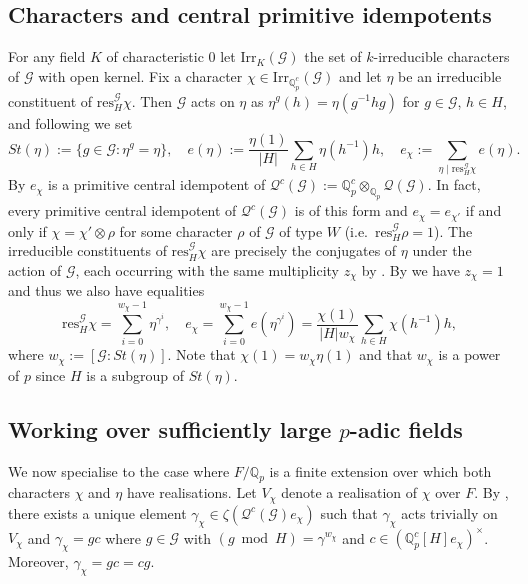 \documentclass[12pt]{amsart}
\theoremstyle{plain}
\theoremstyle{remark}
\theoremstyle{definition}
\numberwithin{equation}{section}
\begin{document}
\subsection{Characters and central primitive idempotents} \label{subsec:idempotents}
For any field $K$ of characteristic $0$ let ${\mathrm{Irr}}_{K}(\mathcal{G})$ the set of $k$-irreducible characters of $\mathcal{G}$ with open kernel.
Fix a character $\chi \in {\mathrm{Irr}}_{{\mathbb{Q}}_{p}^{c}}(\mathcal{G})$ and let $\eta$ be an irreducible constituent of
${\mathrm{res}}^{\mathcal{G}}_{H} \chi$.
Then $\mathcal{G}$ acts on $\eta$ as $\eta^{g}(h) = \eta(g^{-1}hg)$
for $g \in \mathcal{G}$, $h \in H$, and following \cite[\S 2]{MR2114937} we set
\[
St(\eta) := \{g \in \mathcal{G}: \eta^g = \eta \}, \quad e(\eta) := \frac{\eta(1)}{|H|} \sum_{h \in H} \eta(h^{-1}) h,
\quad e_{\chi} := \sum_{\eta \mid {\mathrm{res}}^{\mathcal{G}}_{H} \chi} e(\eta).
\]
By \cite[Corollary to Proposition 6]{MR2114937} $e_{\chi}$ is a primitive central idempotent of
$\mathcal{Q}^{c}(\mathcal{G}) := {\mathbb{Q}}_{p}^{c} \otimes_{{\mathbb{Q}}_{p}} \mathcal{Q}(\mathcal{G})$.
In fact, every primitive central idempotent of $\mathcal{Q}^{c}(\mathcal{G})$ is of this form
and $e_{\chi} = e_{\chi'}$ if and only if $\chi = \chi' \otimes \rho$ for some character $\rho$ of $\mathcal{G}$ of type $W$
(i.e.~${\mathrm{res}}^{\mathcal{G}}_{H} \rho = 1$).
The irreducible constituents of ${\mathrm{res}}^{\mathcal{G}}_{H} \chi$ are precisely the conjugates of $\eta$
under the action of $\mathcal{G}$, each occurring with the same multiplicity $z_{\chi}$ by \cite[Proposition 11.4]{MR632548}. By \cite[Lemma 4]{MR2114937} we have $z_{\chi}=1$ and thus we also have equalities
\begin{equation}\label{eq:idem-sum}
{\mathrm{res}}^{\mathcal{G}}_{H} \chi = \sum_{i=0}^{w_{\chi}-1} \eta^{\gamma^{i}},
\quad
e_{\chi} = \sum_{i=0}^{w_{\chi}-1} e(\eta^{\gamma^{i}}) = \frac{\chi(1)}{|H|w_{\chi}}\sum_{h \in H} \chi(h^{-1})h,
\end{equation}
where $w_{\chi} := [\mathcal{G} : St(\eta)]$.
Note that  $\chi(1) = w_{\chi} \eta(1)$ and that
$w_{\chi}$ is a power of $p$ since $H$ is a subgroup of $St(\eta)$.

\subsection{Working over sufficiently large $p$-adic fields}\label{subsec:sufficiently-large}
We now specialise to the case where $F/{\mathbb{Q}}_{p}$ is a finite extension over which both
characters $\chi$ and $\eta$ have realisations.
Let $V_{\chi}$ denote a realisation of $\chi$ over $F$.	
By \cite[Proposition 5]{MR2114937}, there exists a unique element
$\gamma_{\chi} \in \zeta(\mathcal{Q}^{c}(\mathcal{G})e_{\chi})$ such that $\gamma_{\chi}$
acts trivially on $V_{\chi}$ and $\gamma_{\chi}= gc$ where $g \in \mathcal{G}$ with $(g \bmod H) = \gamma^{w_{\chi}}$
and $c \in ({\mathbb{Q}}_{p}^{c}[H]e_{\chi})^{\times}$. Moreover, $\gamma_{\chi}= gc=cg$.
\end{document}
